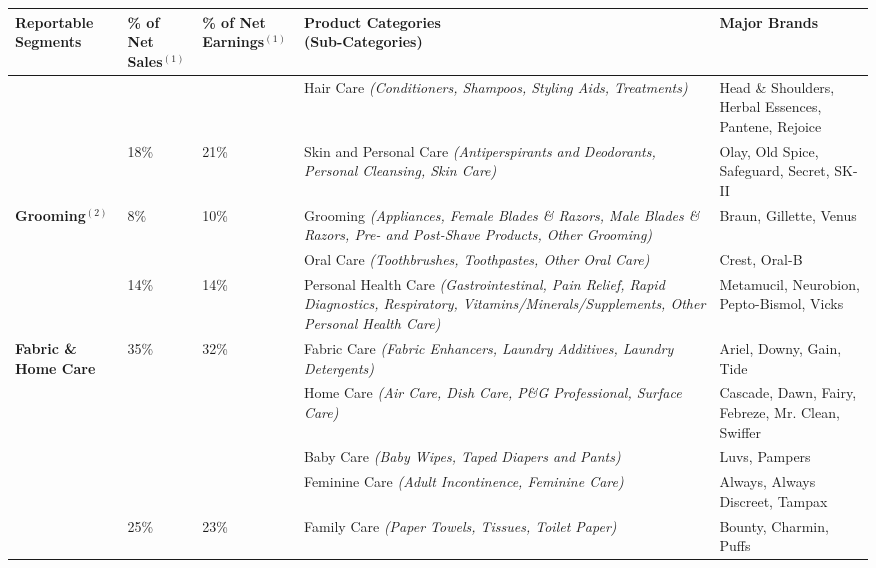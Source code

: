 \documentclass{article}
\begin{document}
\small


\begin{tabularx}{\textwidth}{b{3.5cm}b{1.2cm}b{1.2cm}X b{3.5cm}}

\textbf{Reportable Segments} & \textbf{\% of Net Sales$^{(1)}$} & \textbf{\% of Net Earnings$^{(1)}$} & \makecell{\textbf{Product Categories} \\ \textbf{(Sub-Categories)}} & \textbf{Major Brands} \\
\hline
\rowcolor{cyan!20}
&&& Hair Care \textit{(Conditioners, Shampoos, Styling Aids, Treatments)} & Head \& Shoulders, Herbal Essences, Pantene, Rejoice \\
\rowcolor{cyan!20}
\multirow{-2}{=}{\textbf{Beauty}} 
& \multirow{-2}{=}{18\%} 
& \multirow{-2}{=}{21\%} 
& Skin and Personal Care \textit{(Antiperspirants and Deodorants, Personal Cleansing, Skin Care)} & Olay, Old Spice, Safeguard, Secret, SK-II \\



\multirow{0}{=}{\textbf{Grooming}$^{(2)}$} 
& \multirow{0}{=}{8\%} 
& \multirow{0}{=}{10\%} 
& Grooming \textit{(Appliances, Female Blades \& Razors, Male Blades \& Razors, Pre- and Post-Shave Products, Other Grooming)} & Braun, Gillette, Venus \\



\rowcolor{cyan!20}
&&& Oral Care \textit{(Toothbrushes, Toothpastes, Other Oral Care)} & Crest, Oral-B \\
\rowcolor{cyan!20}
\multirow{-1}{=}{\textbf{Health Care}}
& \multirow{-1}{=}{14\%} 
& \multirow{-1}{=}{14\%} 
& Personal Health Care \textit{(Gastrointestinal, Pain Relief, Rapid Diagnostics, Respiratory, Vitamins/Minerals/Supplements, Other Personal Health Care)} & Metamucil, Neurobion, Pepto-Bismol, Vicks \\



\multirow{4}{=}{\textbf{Fabric \& Home Care}} 
& \multirow{4}{=}{35\%} 
& \multirow{4}{=}{32\%} 
& Fabric Care \textit{(Fabric Enhancers, Laundry Additives, Laundry Detergents)} & Ariel, Downy, Gain, Tide \\
&&& Home Care \textit{(Air Care, Dish Care, P\&G Professional, Surface Care)} & Cascade, Dawn, Fairy, Febreze, Mr. Clean, Swiffer \\



\rowcolor{cyan!20}
&&& Baby Care \textit{(Baby Wipes, Taped Diapers and Pants)} & Luvs, Pampers \\
\rowcolor{cyan!20}
&&& Feminine Care \textit{(Adult Incontinence, Feminine Care)} & Always, Always Discreet, Tampax \\
\rowcolor{cyan!20}
\multirow{-4}{=}{\textbf{Baby, Feminine \& Family Care}}
& \multirow{-4}{=}{25\%}
& \multirow{-4}{=}{23\%}
& Family Care \textit{(Paper Towels, Tissues, Toilet Paper)} & Bounty, Charmin, Puffs \\

\end{tabularx}
\end{document}

